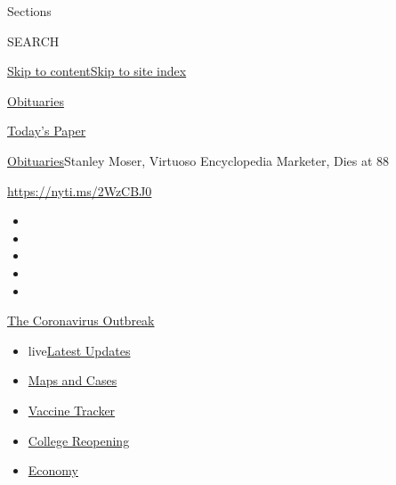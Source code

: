Sections

SEARCH

\protect\hyperlink{site-content}{Skip to
content}\protect\hyperlink{site-index}{Skip to site index}

\href{https://www.nytimes3xbfgragh.onion/section/obituaries}{Obituaries}

\href{https://myaccount.nytimes3xbfgragh.onion/auth/login?response_type=cookie\&client_id=vi}{}

\href{https://www.nytimes3xbfgragh.onion/section/todayspaper}{Today's
Paper}

\href{/section/obituaries}{Obituaries}\textbar{}Stanley Moser, Virtuoso
Encyclopedia Marketer, Dies at 88

\url{https://nyti.ms/2WzCBJ0}

\begin{itemize}
\item
\item
\item
\item
\item
\end{itemize}

\href{https://www.nytimes3xbfgragh.onion/news-event/coronavirus?action=click\&pgtype=Article\&state=default\&region=TOP_BANNER\&context=storylines_menu}{The
Coronavirus Outbreak}

\begin{itemize}
\tightlist
\item
  live\href{https://www.nytimes3xbfgragh.onion/2020/08/04/world/coronavirus-covid-19.html?action=click\&pgtype=Article\&state=default\&region=TOP_BANNER\&context=storylines_menu}{Latest
  Updates}
\item
  \href{https://www.nytimes3xbfgragh.onion/interactive/2020/us/coronavirus-us-cases.html?action=click\&pgtype=Article\&state=default\&region=TOP_BANNER\&context=storylines_menu}{Maps
  and Cases}
\item
  \href{https://www.nytimes3xbfgragh.onion/interactive/2020/science/coronavirus-vaccine-tracker.html?action=click\&pgtype=Article\&state=default\&region=TOP_BANNER\&context=storylines_menu}{Vaccine
  Tracker}
\item
  \href{https://www.nytimes3xbfgragh.onion/2020/08/02/us/covid-college-reopening.html?action=click\&pgtype=Article\&state=default\&region=TOP_BANNER\&context=storylines_menu}{College
  Reopening}
\item
  \href{https://www.nytimes3xbfgragh.onion/live/2020/08/03/business/stock-market-today-coronavirus?action=click\&pgtype=Article\&state=default\&region=TOP_BANNER\&context=storylines_menu}{Economy}
\end{itemize}

